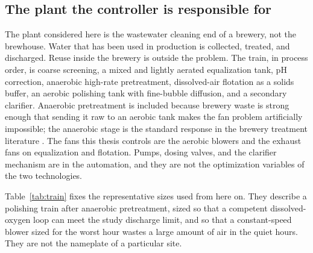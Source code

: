 \subsection{The plant the controller is responsible for}

The plant considered here is the wastewater cleaning end of a brewery, not the brewhouse. Water that has been used in production is collected, treated, and discharged. Reuse inside the brewery is outside the problem. The train, in process order, is coarse screening, a mixed and lightly aerated equalization tank, pH correction, anaerobic high-rate pretreatment, dissolved-air flotation as a solids buffer, an aerobic polishing tank with fine-bubble diffusion, and a secondary clarifier. Anaerobic pretreatment is included because brewery waste is strong enough that sending it raw to an aerobic tank makes the fan problem artificially impossible; the anaerobic stage is the standard response in the brewery treatment literature \cite{simate2011,ashraf2021,werkneh2019,shao2008asbr,chen2016anmbr,ince2000,batstone2002adm1,bernard2001,nopens2009interface}. The fans this thesis controls are the aerobic blowers and the exhaust fans on equalization and flotation. Pumps, dosing valves, and the clarifier mechanism are in the automation, and they are not the optimization variables of the two technologies.

Table~\ref{tab:train} fixes the representative sizes used from here on. They describe a polishing train after anaerobic pretreatment, sized so that a competent dissolved-oxygen loop can meet the study discharge limit, and so that a constant-speed blower sized for the worst hour wastes a large amount of air in the quiet hours. They are not the nameplate of a particular site.


